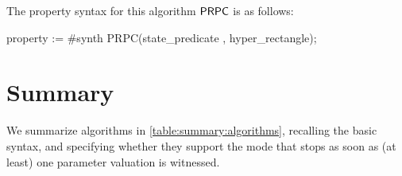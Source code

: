 The property syntax for this algorithm $\mathsf{PRPC}$ is as follows:

\begin{IMITATORproperty}
property := #synth PRPC(state_predicate , hyper_rectangle);
\end{IMITATORproperty}



\section{Summary}\label{section:algorithm:summary}

We summarize algorithms in \cref{table:summary:algorithms}, recalling the basic syntax, and specifying whether they support the  mode that stops as soon as (at least) one parameter valuation is witnessed.

